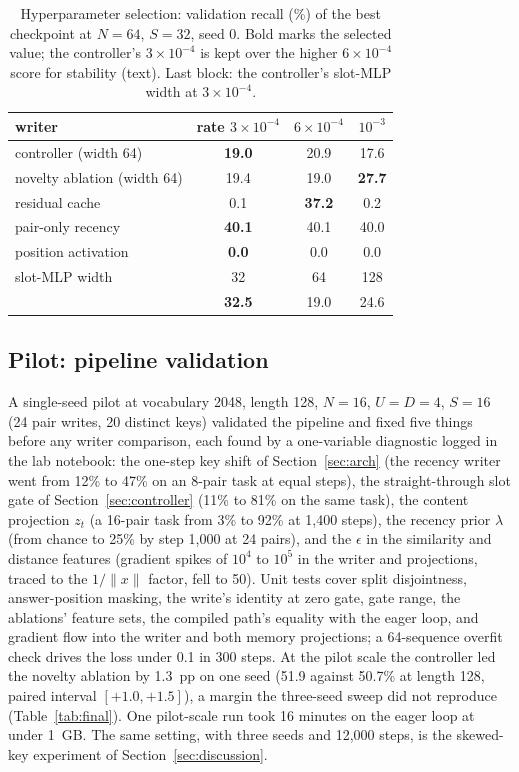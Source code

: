 \documentclass[conference]{IEEEtran}
\begin{document}
\begin{table}[t]
\caption{Hyperparameter selection: validation recall (\%) of the best
checkpoint at $N = 64$, $S = 32$, seed 0. Bold marks the selected value; the
controller's $3\times10^{-4}$ is kept over the higher $6\times10^{-4}$ score
for stability (text). Last block: the controller's slot-MLP width at
$3\times10^{-4}$.}
\label{tab:hparams}
\centering
\footnotesize
\begin{tabular}{lccc}
\toprule
writer & rate $3\times10^{-4}$ & $6\times10^{-4}$ & $10^{-3}$ \\
\midrule
controller (width 64) & \textbf{19.0} & 20.9 & 17.6 \\
novelty ablation (width 64) & 19.4 & 19.0 & \textbf{27.7} \\
residual cache & 0.1 & \textbf{37.2} & 0.2 \\
pair-only recency & \textbf{40.1} & 40.1 & 40.0 \\
position activation & \textbf{0.0} & 0.0 & 0.0 \\
\midrule
slot-MLP width & 32 & 64 & 128 \\
 & \textbf{32.5} & 19.0 & 24.6 \\
\bottomrule
\end{tabular}
\end{table}



\subsection{Pilot: pipeline validation}
\label{sec:pilot}

A single-seed pilot at vocabulary 2048, length 128, $N = 16$, $U = D = 4$,
$S = 16$ (24 pair writes, 20 distinct keys) validated the pipeline and fixed
five things before any writer comparison, each found by a one-variable
diagnostic logged in the lab notebook: the one-step key shift of
Section~\ref{sec:arch} (the recency writer went from 12\% to 47\% on an
8-pair task at equal steps), the straight-through slot gate of
Section~\ref{sec:controller} (11\% to 81\% on the same task), the content
projection $z_t$ (a 16-pair task from 3\% to 92\% at 1{,}400 steps), the
recency prior $\lambda$ (from chance to 25\% by step 1{,}000 at 24 pairs), and
the $\epsilon$ in the similarity and distance features (gradient spikes of
$10^4$ to $10^5$ in the writer and projections, traced to the $1/\lVert
x\rVert$ factor, fell to 50). Unit tests cover split disjointness,
answer-position masking, the write's identity at zero gate, gate range, the
ablations' feature sets, the compiled path's equality with the eager loop,
and gradient flow into the writer and both memory projections; a 64-sequence
overfit check drives the loss under 0.1 in 300 steps. At the pilot scale the
controller led the novelty ablation by 1.3~pp on one seed (51.9 against
50.7\% at length 128, paired interval $[+1.0, +1.5]$), a margin the three-seed
sweep did not reproduce (Table~\ref{tab:final}). One pilot-scale run took 16
minutes on the eager loop at under 1~GB. The same setting, with three seeds
and 12{,}000 steps, is the skewed-key experiment of
Section~\ref{sec:discussion}.
\end{document}

